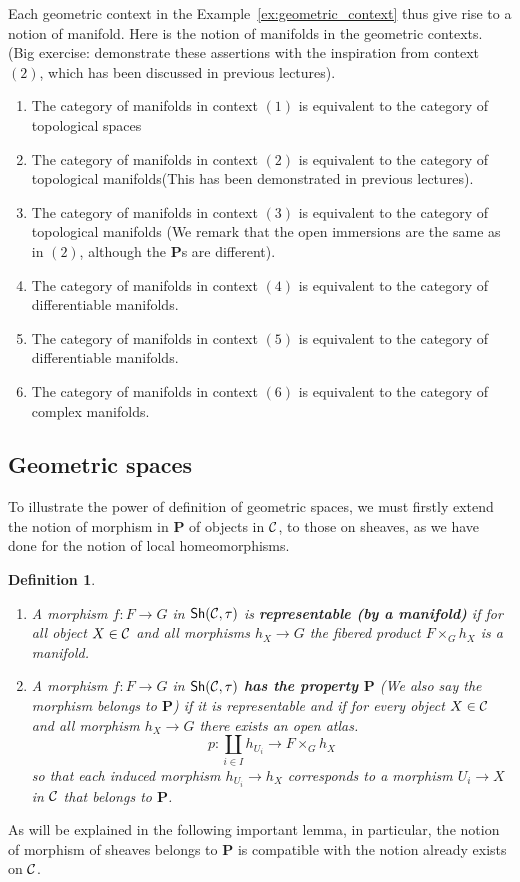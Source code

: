 \documentclass{tufte-book} %
\numberwithin{dummy}{section}
\newtheorem{dfn}[thm]{Definition}
\newcommand{\calc}{{\cal C}}
\newcommand{\lrta}{\longrightarrow}
\newcommand{\ssh}{\mathsf{Sh}}
\newcommand{\bfp}{\mathbf{P}}
\begin{document}
Each geometric context in the Example~\ref{ex:geometric_context} thus give rise to a notion of manifold. Here is the notion of manifolds in the geometric contexts. (Big exercise: demonstrate these assertions with the inspiration from context $(2)$, which has been discussed in previous lectures).
\begin{enumerate}
\item The category of manifolds in context $(1)$ is equivalent to the category of topological spaces
\item The category of manifolds in context $(2)$ is equivalent to the category of topological manifolds(This has been demonstrated in previous lectures).
\item The category of manifolds in context $(3)$ is equivalent to the category of topological manifolds
(We remark that the open immersions are the same as in $(2)$, although the $\bfp$s are different).
\item The category of manifolds in context $(4)$ is equivalent to the category of differentiable manifolds.
\item The category of manifolds in context $(5)$ is equivalent to the category of differentiable manifolds.
\item The category of manifolds in context $(6)$ is equivalent to the category of complex manifolds.
\end{enumerate}


\subsection{Geometric spaces}
To illustrate the  power of definition of geometric spaces, we must firstly extend the notion of morphism in $\bfp$ of objects in $\calc$, to those on sheaves, as we have done for the notion of local homeomorphisms.
\begin{dfn}\label{dfn:geometric_space_property}\ 
\begin{enumerate}
\item A morphism $f: F\lrta G$ in $\ssh(\calc,\tau)$ is \textbf{representable (by a manifold)} if for all object $X\in \calc$ and all morphisms $h_X\lrta G$ the fibered product $F\times_G h_X$ is a manifold.
\item A morphism $f:F\lrta G$ in $\ssh(\calc,\tau)$ \textbf{has the property $\bfp$} (We also say the morphism belongs to $\bfp$) if it is representable and if for every object $X\in\calc$ and all morphism $h_X\lrta G$ there exists an open atlas.
$$
p:\coprod_{i\in I}h_{U_i}\lrta F\times_G h_X
$$
so that each induced morphism $h_{U_i}\lrta h_X$ corresponds to a morphism $U_i\lrta X$ in $\calc$ that belongs to $\bfp$.
\end{enumerate}
\end{dfn} 
As will be explained in the following important lemma, in particular, the notion of morphism of sheaves belongs to $\bfp$ is compatible with the notion already exists on $\calc$.
\end{document}
